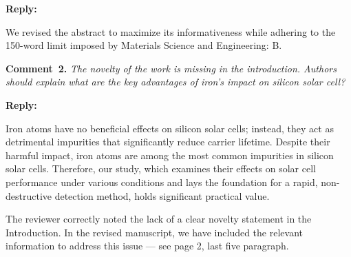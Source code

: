 \documentclass[a4paper,fleqn]{cas-sc}
\begin{document}
\noindent
\textcolor[rgb]{0.51,0.00,0.00}{\textbf{Reply:}}

We revised the abstract to maximize its informativeness while adhering to the 150-word limit imposed by Materials Science and Engineering: B.


\vspace{1cm}
\noindent
\textcolor[rgb]{0.00,0.50,1.00}{\textbf{Comment~2.}}
\emph{The novelty of the work is missing in the introduction. Authors should explain what are the key advantages of iron's impact on silicon solar cell?}


\noindent
\textcolor[rgb]{0.51,0.00,0.00}{\textbf{Reply:}}

Iron atoms have no beneficial effects on silicon solar cells;
instead, they act as detrimental impurities that significantly reduce carrier lifetime.
Despite their harmful impact, iron atoms are among the most common impurities in silicon solar cells.
Therefore, our study, which examines their effects on solar cell performance under various conditions and lays the foundation for a rapid, non-destructive detection method, holds significant practical value.

The reviewer correctly noted the lack of a clear novelty statement in the Introduction.
In the revised manuscript, we have included the relevant information to address this issue --- see page 2, last five paragraph.
\end{document}
